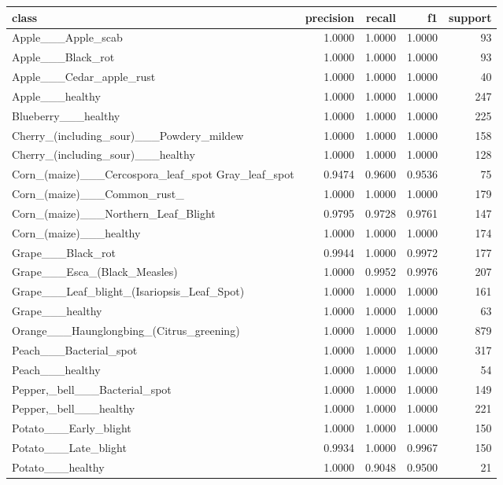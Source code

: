 \begin{tabular}{lrrrr}
\toprule
class & precision & recall & f1 & support \\
\midrule
Apple\_\_\_Apple\_scab & 1.0000 & 1.0000 & 1.0000 & 93 \\
Apple\_\_\_Black\_rot & 1.0000 & 1.0000 & 1.0000 & 93 \\
Apple\_\_\_Cedar\_apple\_rust & 1.0000 & 1.0000 & 1.0000 & 40 \\
Apple\_\_\_healthy & 1.0000 & 1.0000 & 1.0000 & 247 \\
Blueberry\_\_\_healthy & 1.0000 & 1.0000 & 1.0000 & 225 \\
Cherry\_(including\_sour)\_\_\_Powdery\_mildew & 1.0000 & 1.0000 & 1.0000 & 158 \\
Cherry\_(including\_sour)\_\_\_healthy & 1.0000 & 1.0000 & 1.0000 & 128 \\
Corn\_(maize)\_\_\_Cercospora\_leaf\_spot Gray\_leaf\_spot & 0.9474 & 0.9600 & 0.9536 & 75 \\
Corn\_(maize)\_\_\_Common\_rust\_ & 1.0000 & 1.0000 & 1.0000 & 179 \\
Corn\_(maize)\_\_\_Northern\_Leaf\_Blight & 0.9795 & 0.9728 & 0.9761 & 147 \\
Corn\_(maize)\_\_\_healthy & 1.0000 & 1.0000 & 1.0000 & 174 \\
Grape\_\_\_Black\_rot & 0.9944 & 1.0000 & 0.9972 & 177 \\
Grape\_\_\_Esca\_(Black\_Measles) & 1.0000 & 0.9952 & 0.9976 & 207 \\
Grape\_\_\_Leaf\_blight\_(Isariopsis\_Leaf\_Spot) & 1.0000 & 1.0000 & 1.0000 & 161 \\
Grape\_\_\_healthy & 1.0000 & 1.0000 & 1.0000 & 63 \\
Orange\_\_\_Haunglongbing\_(Citrus\_greening) & 1.0000 & 1.0000 & 1.0000 & 879 \\
Peach\_\_\_Bacterial\_spot & 1.0000 & 1.0000 & 1.0000 & 317 \\
Peach\_\_\_healthy & 1.0000 & 1.0000 & 1.0000 & 54 \\
Pepper,\_bell\_\_\_Bacterial\_spot & 1.0000 & 1.0000 & 1.0000 & 149 \\
Pepper,\_bell\_\_\_healthy & 1.0000 & 1.0000 & 1.0000 & 221 \\
Potato\_\_\_Early\_blight & 1.0000 & 1.0000 & 1.0000 & 150 \\
Potato\_\_\_Late\_blight & 0.9934 & 1.0000 & 0.9967 & 150 \\
Potato\_\_\_healthy & 1.0000 & 0.9048 & 0.9500 & 21 \\

\end{tabular}
